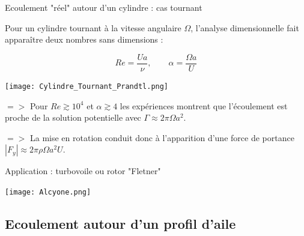 \begin{frame}{Ecoulement "réel" autour d'un cylindre : cas tournant}  \hypertarget{frame:toto}{}

\small

Pour un cylindre tournant à la vitesse angulaire $\Omega$, l'analyse dimensionnelle fait apparaître deux nombres sans dimensions :

$$Re = \frac{ U a }{\nu} , \qquad \alpha = \frac{ \Omega a}{U} 
$$

\pause
\begin{center}
\texttt{[image: Cylindre\_Tournant\_Prandtl.png]}
\end{center}

\pause

$=>$ Pour $Re \gtrsim 10^4$ et $\alpha \gtrsim 4$ les expériences montrent que l'écoulement est proche de la solution potentielle 
avec $\Gamma \approx 2 \pi \Omega a^2$.

\pause
\smallskip

$=>$ La mise en rotation conduit donc à l'apparition d'une force de portance $|F_y| \approx  2 \pi \rho \Omega a^2 U$.

\end{frame}






\begin{frame}{Application : turbovoile ou rotor "Fletner"} \hypertarget{frame:toto}{}

\small

\texttt{[image: Alcyone.png]}


\end{frame}





\subsection{Ecoulement autour d'un profil d'aile}


